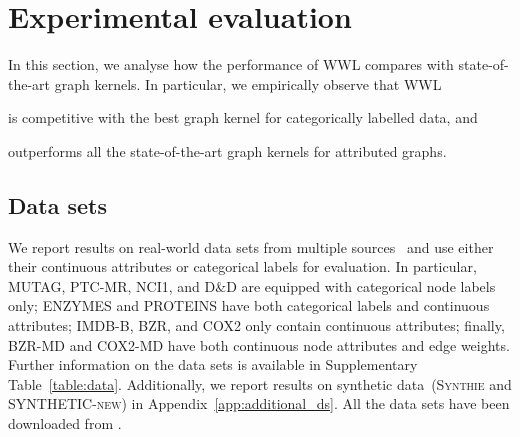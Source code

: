 \documentclass{article}
\begin{document}
\begin{comment}
 \begin{tabular}{lcccccccc}
    \toprule
    Method & BZR & COX2 & BZR-MD & COX2-MD\\
    \midrule
    VH-CONT  &  &  &  &  \\
    RBF-WL &  & & () &  \\
    \midrule
    HGK-WL &  &   &  &  \\
    HGK-SP &  &   &  &  \\
    \midrule
    GH &  &  &  &  \\
    \midrule
    WWL  &   &  &  &  \\
    
    \bottomrule
\end{tabular}
\end{comment}

\section{Experimental evaluation}
\label{sec:results}

In this section, we analyse how the performance of WWL compares with state-of-the-art graph kernels. In particular, we empirically observe that WWL
\begin{inparaenum}[(1)]
    \item is competitive with the best graph kernel for categorically labelled data, and
    \item outperforms all the state-of-the-art graph kernels for attributed graphs. 
\end{inparaenum}

\subsection{Data sets}

We report results on real-world data sets from multiple sources~\citep{borgwardt2005protein, vishwanathan2010graph,shervashidze2011weisfeiler} and use either their continuous attributes or categorical labels for evaluation. In particular, \textsc{MUTAG}, \textsc{PTC-MR}, \textsc{NCI1}, and \textsc{D\&D} are equipped with categorical node labels only; \textsc{ENZYMES} and  \textsc{PROTEINS} have both categorical labels and continuous attributes; \textsc{IMDB-B}, \textsc{BZR}, and \textsc{COX2} only contain continuous attributes; finally, \textsc{BZR-MD} and \textsc{COX2-MD} have both continuous node attributes and edge weights. 
Further information on the data sets is available in Supplementary Table~\ref{table:data}. 
Additionally, we report results on synthetic data~(\textsc{Synthie} and \textsc{SYNTHETIC-new}) in Appendix~\ref{app:additional_ds}. All the data sets have been downloaded from \citet{repoker2016}. 
\end{document}
